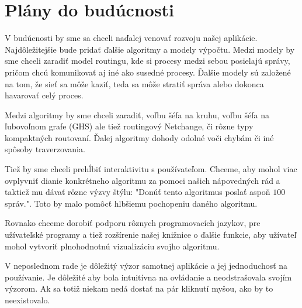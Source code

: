 \section{Plány do budúcnosti}

V budúcnosti by sme sa chceli naďalej venovať rozvoju našej aplikácie. Najdôležitejšie bude pridať
ďalšie algoritmy a modely výpočtu. Medzi modely by sme chceli zaradiť model routingu, kde si procesy
medzi sebou posielajú správy, pričom chcú komunikovať aj iné ako susedné procesy. Ďalšie modely sú
založené na tom, že sieť sa môže kaziť, teda sa môže stratiť správa alebo dokonca havarovať celý
proces.

Medzi algoritmy by sme chceli zaradiť, voľbu šéfa na kruhu, voľbu šéfa na ľubovoľnom grafe
(GHS\cite{tell2000}) ale
tiež routingový Netchange, či rôzne typy kompaktných routovaní. Ďalej algoritmy dohody odolné voči
chybám či iné spôsoby traverzovania.

Tiež by sme chceli prehĺbiť interaktivitu s používateľom. Chceme, aby mohol viac ovplyvniť dianie
konkrétneho algoritmu za pomoci našich nápovedných rád a taktiež mu dávať rôzne výzvy štýlu: "Donúť
tento algoritmus poslať aspoň $100$ správ.". Toto by malo pomôcť hlbšiemu pochopeniu daného
algoritmu.

Rovnako chceme dorobiť podporu rôznych programovacích jazykov, pre užívateľské programy a tiež
rozšírenie našej knižnice o ďalšie funkcie, aby užívateľ mohol vytvoriť plnohodnotnú vizualizáciu
svojho algoritmu.

V neposlednom rade je dôležitý výzor samotnej aplikácie a jej jednoduchosť na používanie. Je
dôležité aby bola intuitívna na ovládanie a neodstrašovala svojím výzorom. Ak sa totiž niekam nedá
dostať na pár kliknutí myšou, ako by to neexistovalo.
